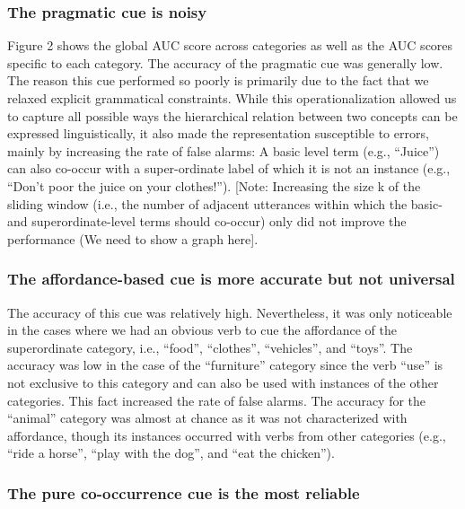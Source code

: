 \documentclass[10pt, letterpaper]{article}
\begin{document}
\hypertarget{the-pragmatic-cue-is-noisy}{%
\subsubsection{The pragmatic cue is
noisy}\label{the-pragmatic-cue-is-noisy}}

Figure 2 shows the global AUC score across categories as well as the AUC
scores specific to each category. The accuracy of the pragmatic cue was
generally low. The reason this cue performed so poorly is primarily due
to the fact that we relaxed explicit grammatical constraints. While this
operationalization allowed us to capture all possible ways the
hierarchical relation between two concepts can be expressed
linguistically, it also made the representation susceptible to errors,
mainly by increasing the rate of false alarms: A basic level term (e.g.,
``Juice'') can also co-occur with a super-ordinate label of which it is
not an instance (e.g., ``Don't poor the juice on your clothes!'').
{[}Note: Increasing the size k of the sliding window (i.e., the number
of adjacent utterances within which the basic- and superordinate-level
terms should co-occur) only did not improve the performance (We need to
show a graph here{]}.

\hypertarget{the-affordance-based-cue-is-more-accurate-but-not-universal}{%
\subsubsection{The affordance-based cue is more accurate but not
universal}\label{the-affordance-based-cue-is-more-accurate-but-not-universal}}

The accuracy of this cue was relatively high. Nevertheless, it was only
noticeable in the cases where we had an obvious verb to cue the
affordance of the superordinate category, i.e., ``food'', ``clothes'',
``vehicles'', and ``toys''. The accuracy was low in the case of the
``furniture'' category since the verb ``use'' is not exclusive to this
category and can also be used with instances of the other categories.
This fact increased the rate of false alarms. The accuracy for the
``animal'' category was almost at chance as it was not characterized
with affordance, though its instances occurred with verbs from other
categories (e.g., ``ride a horse'', ``play with the dog'', and ``eat the
chicken'').

\hypertarget{the-pure-co-occurrence-cue-is-the-most-reliable}{%
\subsubsection{The pure co-occurrence cue is the most
reliable}\label{the-pure-co-occurrence-cue-is-the-most-reliable}}
\end{document}
